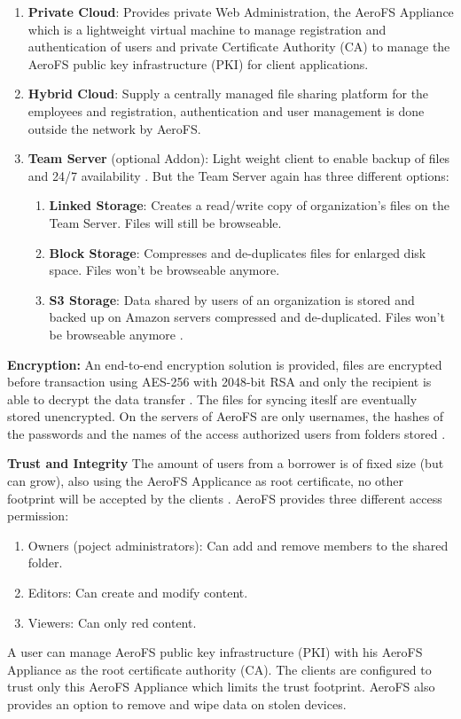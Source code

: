 \begin{enumerate}
\item \textbf{Private Cloud}: Provides private Web Administration, the AeroFS Appliance which is a lightweight virtual machine to manage registration and authentication of users and private Certificate Authority (CA) to manage the AeroFS public key infrastructure (PKI) for client applications.
\item \textbf{Hybrid Cloud}: Supply a centrally managed file sharing platform for the employees and registration, authentication and user management is done outside the network by AeroFS.
\item \textbf{Team Server} (optional Addon): Light weight client to enable backup of files and 24/7 availability \cite{aerofs:cloud_types}. But the Team Server again has three different options:
	\begin{enumerate}
	\item \textbf{Linked Storage}: Creates a read/write copy of organization's files on the Team Server. Files will still be browseable.
	\item \textbf{Block Storage}: Compresses and de-duplicates files for enlarged disk space. Files won't be browseable anymore.
	\item \textbf{S3 Storage}: Data shared by users of an organization is stored and backed up on Amazon servers compressed and de-duplicated. Files won't be browseable anymore \cite{aerofs:storage_types}.
	\end{enumerate}
\end{enumerate}

\textbf{Encryption:} An end-to-end encryption solution is provided, files are encrypted before transaction using AES-256 with 2048-bit RSA and only the recipient is able to decrypt the data transfer \cite{aerofs:security}. The files for syncing iteslf are eventually stored unencrypted. On the servers of AeroFS are only usernames, the hashes of the passwords and the names of the access authorized users from folders stored \cite{aerofs:security_2}.

\textbf{Trust and Integrity} The amount of users from a borrower is of fixed size (but can grow), also using the AeroFS Applicance as root certificate, no other footprint will be accepted by the clients \cite{aerofs:security}. AeroFS provides three different access permission:
\begin{enumerate}
\item Owners (poject administrators): Can add and remove members to the shared folder.
\item Editors: Can create and modify content.
\item Viewers: Can only red content.
\end{enumerate}
A user can manage AeroFS  public key infrastructure (PKI) with his AeroFS Appliance as the root certificate authority (CA). The clients are configured to trust only this AeroFS Appliance which limits the trust footprint. AeroFS also provides an option to remove and wipe data on stolen devices.

